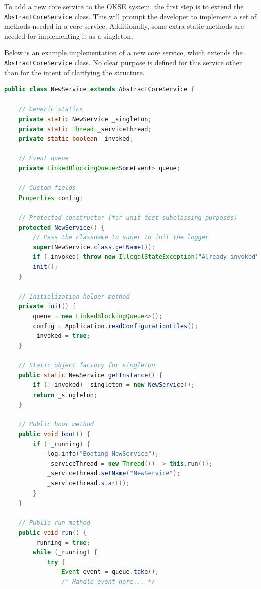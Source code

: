 To add a new core service to the OKSE system, the first step is to extend the \\\verb!AbstractCoreService! class. This will prompt the developer to implement a set of methods needed in a core service. Additionally, some extra static methods are needed for implementing it as a singleton.

Below is an example implementation of a new core service, which extends the \\\verb!AbstractCoreService! class. No clear purpose is defined for this service other than for the intent of clarifying the structure.

\begin{lstlisting}[language=Java, captionpos=b, caption=Creating a new core service, frame=bt, showstringspaces=false]
public class NewService extends AbstractCoreService {

    // Generic statics
    private static NewService _singleton;
    private static Thread _serviceThread;
    private static boolean _invoked;
    
    // Event queue
    private LinkedBlockingQueue<SomeEvent> queue;
    
    // Custom fields
    Properties config;
    
    // Protected constructor (for unit test subclassing purposes)
    protected NewService() {
        // Pass the classname to super to init the logger
        super(NewService.class.getName());
        if (_invoked) throw new IllegalStateException("Already invoked");
        init();
    }
    
    // Initialization helper method
    private init() {
        queue = new LinkedBlockingQueue<>();
        config = Application.readConfigurationFiles();
        _invoked = true;
    }
    
    // Static object factory for singleton
    public static NewService getInstance() {
        if (!_invoked) _singleton = new NewService();
        return _singleton;
    }
    
    // Public boot method
    public void boot() {
        if (!_running) {
            log.info("Booting NewService");
            _serviceThread = new Thread(() -> this.run());
            _serviceThread.setName("NewService");
            _serviceThread.start();
        }
    }
    
    // Public run method
    public void run() {
        _running = true;
        while (_running) {
            try {
                Event event = queue.take();
                /* Handle event here... */
                

\end{lstlisting}
